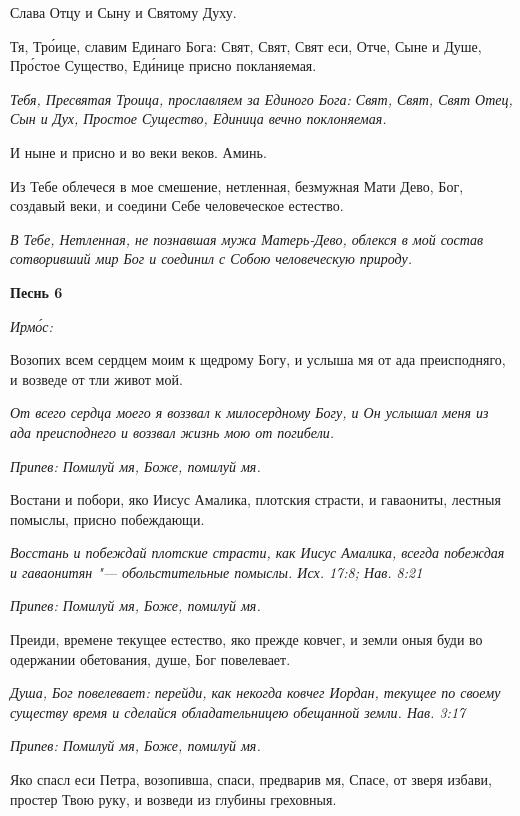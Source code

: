 Слава Отцу и Сыну и Святому Духу.


Тя, Тро́ице, славим Единаго Бога: Свят, Свят, Свят еси, Отче, Сыне и Душе, Про́стое Существо, Еди́нице присно покланяемая.


\itshape Тебя, Пресвятая Троица, прославляем за Единого Бога: Свят, Свят, Свят Отец, Сын и Дух, Простое Существо, Единица вечно поклоняемая.\normalfont{}


И ныне и присно и во веки веков. Аминь.


Из Тебе облечеся в мое смешение, нетленная, безмужная Мати Дево, Бог, создавый веки, и соедини Себе человеческое естество.


\itshape В Тебе, Нетленная, не познавшая мужа Матерь-Дево, облекся в мой состав сотворивший мир Бог и соединил с Собою человеческую природу.\normalfont{}





\bfseries Песнь 6\normalfont{}


\itshape Ирмо́с:\normalfont{}


Возопих всем сердцем моим к щедрому Богу, и услыша мя от ада преисподняго, и возведе от тли живот мой.


\itshape От всего сердца моего я воззвал к милосердному Богу, и Он услышал меня из ада преисподнего и воззвал жизнь мою от погибели.\normalfont{}


\itshape Припев:\normalfont{} Помилуй мя, Боже, помилуй мя.


Востани и побори, яко Иисус Амалика, плотския страсти, и гаваониты, лестныя помыслы, присно побеждающи.


\itshape Восстань и побеждай плотские страсти, как Иисус Амалика, всегда побеждая и гаваонитян "--- обольстительные помыслы. Исх. 17:8; Нав. 8:21\normalfont{}


\itshape Припев:\normalfont{} Помилуй мя, Боже, помилуй мя.


Преиди, времене текущее естество, яко прежде ковчег, и земли оныя буди во одержании обетования, душе, Бог повелевает.


\itshape Душа, Бог повелевает: перейди, как некогда ковчег Иордан, текущее по своему существу время и сделайся обладательницею обещанной земли. Нав. 3:17\normalfont{}


\itshape Припев:\normalfont{} Помилуй мя, Боже, помилуй мя.


Яко спасл еси Петра, возопивша, спаси, предварив мя, Спасе, от зверя избави, простер Твою руку, и возведи из глубины греховныя.


